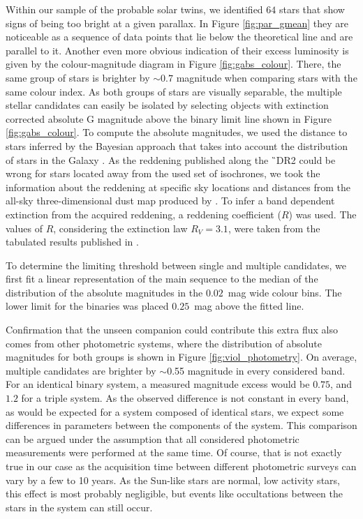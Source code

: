 Within our sample of the probable solar twins, we identified $64$ stars that show signs of being too bright at a given parallax. In Figure \ref{fig:par_gmean} they are noticeable as a sequence of data points that lie below the theoretical line and are parallel to it. Another even more obvious indication of their excess luminosity is given by the colour-magnitude diagram in Figure \ref{fig:gabs_colour}. There, the same group of stars is brighter by $\sim0.7$ magnitude when comparing stars with the same colour index. As both groups of stars are visually separable, the multiple stellar candidates can easily be isolated by selecting objects with extinction corrected absolute G magnitude above the binary limit line shown in Figure \ref{fig:gabs_colour}. To compute the absolute magnitudes, we used the distance to stars inferred by the Bayesian approach that takes into account the distribution of stars in the Galaxy \cite{2018AJ....156...58B}. As the reddening published along the \G\ DR2 \cite{2018A&A...616A...8A} could be wrong for stars located away from the used set of isochrones, we took the information about the reddening at specific sky locations and distances from the all-sky three-dimensional dust map produced by \citet{2017A&A...606A..65C}. To infer a band dependent extinction from the acquired reddening, a reddening coefficient ($R$) was used. The values of $R$, considering the extinction law $R_V = 3.1$, were taken from the tabulated results published in \citet{2011ApJ...737..103S}.

To determine the limiting threshold between single and multiple candidates, we first fit a linear representation of the main sequence to the median of the distribution of the absolute magnitudes in the $0.02$~mag wide colour bins. The lower limit for the binaries was placed $0.25$~mag above the fitted line.

Confirmation that the unseen companion could contribute this extra flux also comes from other photometric systems, where the distribution of absolute magnitudes for both groups is shown in Figure \ref{fig:viol_photometry}. On average, multiple candidates are brighter by $\sim$0.55 magnitude in every considered band. For an identical binary system, a measured magnitude excess would be $0.75$, and $1.2$ for a triple system. As the observed difference is not constant in every band, as would be expected for a system composed of identical stars, we expect some differences in parameters between the components of the system. This comparison can be argued under the assumption that all considered photometric measurements were performed at the same time. Of course, that is not exactly true in our case as the acquisition time between different photometric surveys can vary by a few to 10 years. As the Sun-like stars are normal, low activity stars, this effect is most probably negligible, but events like occultations between the stars in the system can still occur.

